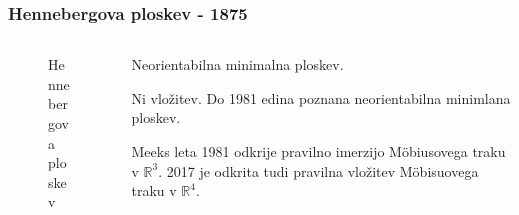 \documentclass[8pt]{beamer}
\newcommand{\samplescalar}{5}  %
\theoremstyle{definition}
\theoremstyle{remark}
\theoremstyle{plain}
\numberwithin{equation}{section}  %
\begin{document}
\begin{frame}
    \frametitle{Hennebergova ploskev - 1875}

    \begin{columns}
        \begin{column}{0.5\textwidth}
            \centering
            \begin{figure}[H]
                \centering
                \caption{Hennebergova ploskev}
            \end{figure}
        \end{column}

        \begin{column}{0.5\textwidth}
            \textcolor{red1}{Neorientabilna minimalna ploskev}. 
            
            Ni vložitev. Do 1981 edina poznana neorientabilna minimlana ploskev. 

            \vspace{0.8em}

            Meeks leta 1981 odkrije pravilno imerzijo Möbiusovega traku v $\mathbb{R}^3$. 2017 je odkrita tudi pravilna vložitev Möbisuovega traku v $\mathbb{R}^4$.
        \end{column}
    \end{columns}
    
\end{frame}
\end{document}
